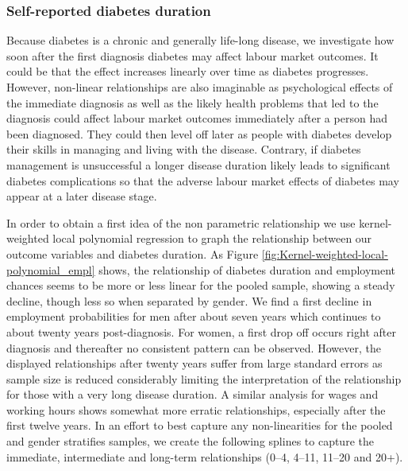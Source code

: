\documentclass[12pt,english,british]{article}
\begin{document}
\subsubsection*{Self-reported diabetes duration}

Because diabetes is a chronic and generally life-long disease, we investigate how soon after the first diagnosis diabetes may affect labour market outcomes. It could be that the effect increases
linearly over time as diabetes progresses. However, non-linear relationships
are also imaginable as psychological effects of the immediate diagnosis
as well as the likely health problems that led to the diagnosis could
affect labour market outcomes immediately after a person had been
diagnosed. They could then level off later as people with diabetes
develop their skills in managing and living with the disease. Contrary, if diabetes management is unsuccessful a longer disease duration likely leads to significant diabetes complications so that the adverse labour market effects of diabetes may appear at a later disease stage.

In order to obtain a first idea of the non parametric relationship
we use kernel-weighted local polynomial regression to graph the relationship
between our outcome variables and diabetes duration. As Figure \ref{fig:Kernel-weighted-local-polynomial_empl}
shows, the relationship of diabetes duration and employment chances
seems to be more or less linear for the pooled sample, showing a steady
decline, though less so when separated by gender. We find a first
decline in employment probabilities for men after about seven years
which continues to about twenty years post-diagnosis. For women,
a first drop off occurs right after diagnosis and thereafter no consistent
pattern can be observed. However, the displayed relationships after
twenty years suffer from large standard errors as sample size is reduced
considerably limiting the interpretation of the relationship for those with a very long disease duration. A similar analysis for wages and working hours shows
somewhat more erratic relationships, especially after the first twelve
years. In an effort to best capture any non-linearities for the pooled
and gender stratifies samples, we create the following splines to
capture the immediate, intermediate and long-term relationships (0--4,
4--11, 11--20 and 20+).   
  
\end{document}
